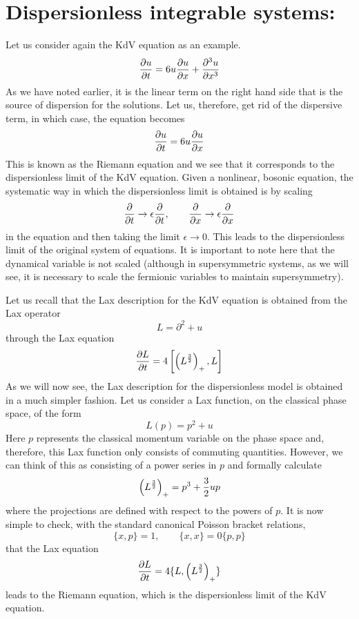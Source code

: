 \documentclass[a4paper,11pt]{article}
\begin{document}
\section{Dispersionless integrable systems:}

Let us consider again the KdV equation as an example.
$$
{\partial u\over \partial t} = 6 u {\partial u\over \partial x} +
{\partial^{3} u\over \partial x^{3}}
$$
As we have noted earlier, it is the linear term on the right hand side
that is the source of dispersion for the solutions. Let us, therefore,
get rid of the dispersive term, in which case, the equation becomes
\begin{equation}
{\partial u\over \partial t} = 6 u {\partial u\over \partial x}
\end{equation}
This is known as the Riemann equation and we see that it corresponds
to the dispersionless limit of the KdV equation. Given a nonlinear,
bosonic equation, the systematic way in which the dispersionless limit
is obtained is by scaling
\begin{equation}
{\partial\over \partial t} \rightarrow \epsilon {\partial\over
\partial t},\qquad {\partial\over \partial x} \rightarrow \epsilon
{\partial \over \partial x}
\end{equation}
in the equation and then taking the limit $\epsilon\rightarrow
0$. This leads to the dispersionless limit of the original system of
equations. It is important to note here that the dynamical variable is
not scaled (although in supersymmetric systems, as we will see, it is
necessary to scale the fermionic variables to maintain supersymmetry).

Let us recall that the Lax description for the KdV equation is
obtained from the Lax operator
$$
L = \partial^{2} + u
$$
through the Lax equation
$$
{\partial L\over \partial t} = 4 \left[\left(L^{3\over 2}\right)_{+} ,
L\right]
$$
As we will now see, the Lax description for the dispersionless model
is obtained in a much simpler fashion. Let us consider a Lax function,
on the classical phase space, of the form
\begin{equation}
L (p) = p^{2} + u
\end{equation}
Here $p$ represents the classical momentum variable on the phase space
and, therefore, this Lax function only consists of commuting
quantities. However, we can think of this as consisting of a power
series in $p$ and formally calculate
\begin{equation}
\left(L^{3\over 2}\right)_{+} = p^{3} + {3\over 2} u p
\end{equation}
where the projections are defined with respect to the powers of
$p$. It is now simple to check, with the standard canonical Poisson
bracket relations,
$$
\{x,p\} = 1,\qquad \{x,x\} = 0 \{p,p\}
$$
that the Lax equation
\begin{equation}
{\partial L\over \partial t} = 4 \{L, \left(L^{3\over 2}\right)_{+}\}
\end{equation}
leads to the Riemann equation, which is the dispersionless limit of
the KdV equation.
\end{document}
